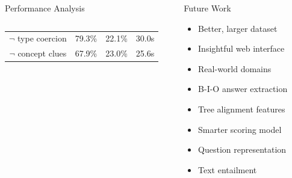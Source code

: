 \documentclass[xcolor=table]{beamer}
\let\olditem\item
\renewcommand\item{\olditem\justifying}
\begin{document}
\begin{frame}[fragile]{}
\begin{columns}[t]
\begin{block}{Performance Analysis}
\begin{columns}[t]
\begin{tabular}{|c|ccc|}
\hline
$\lnot$ type coercion & 79.3\% & 22.1\% & 30.0s \\
$\lnot$ concept clues & 67.9\% & 23.0\% & 25.6s \\
\hline
\end{tabular}


\label{fig:ranks}

\end{columns}
    \end{block}

    \begin{block}{Future Work}
      \begin{multicols}{3}
	      \raggedcolumns
      \setlength{\parskip}{0ex}

\begin{itemize}
	\item Better, larger dataset
	\item Insightful web interface

	\item Real-world domains

	\item B-I-O answer extraction
	\item Tree alignment features
	\item Smarter scoring model
	\item Question representation
	\item Text entailment
\end{itemize}


\end{multicols}
\end{block}
\end{columns}
\end{frame}
\end{document}
